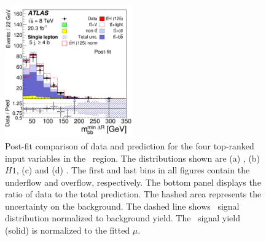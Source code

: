 \begin{figure}[tp]
\begin{center}
\includegraphics[width=0.49\textwidth]{Appendices/Figures_separation/mbb_mindR_5.pdf}
\caption{Post-fit comparison of data and prediction for the four top-ranked input variables in the 
\fivefour\ region. The distributions shown are (a) \cent, (b) $H1$, (c)  \numjetforty and (d) \mbbmindr.
The first and last bins in all figures contain the underflow and
overflow, respectively. The bottom panel displays the ratio of 
data to the total prediction. The hashed area represents the uncertainty on the background.
The dashed line shows \tth\ signal
distribution normalized to background yield. The \tth\ signal yield (solid) 
is normalized to the fitted $\mu$.}
\label{fig:postinput_lj_1} 
\end{center}
\end{figure}

